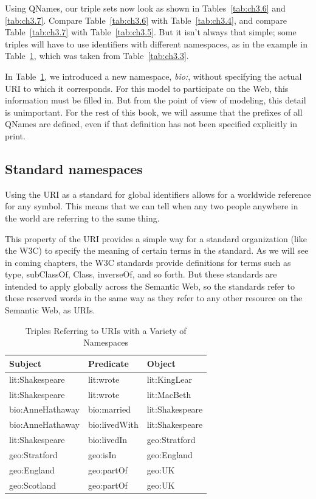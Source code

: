 Using QNames, our triple sets now look as shown in Tables~\ref{tab:ch3.6} and \ref{tab:ch3.7}.
Compare Table~\ref{tab:ch3.6} with Table~\ref{tab:ch3.4}, and compare Table~\ref{tab:ch3.7} with Table~\ref{tab:ch3.5}.
But it isn't always that simple; some triples will have to use
identifiers with different namespaces, as in the example in Table~\ref{tab:ch3.8},
which was taken from Table~\ref{tab:ch3.3}.

In Table~\ref{tab:ch3.8}, we introduced a new namespace, \emph{bio:}, without
specifying the actual URI to which it corresponds. For this model to
participate on the Web, this information must be filled in. But from the
point of view of modeling, this detail is unimportant. For the rest of
this book, we will assume that the prefixes of all QNames are defined,
even if that definition has not been specified explicitly in print.

\subsection{Standard namespaces}

Using the URI as a standard for global identifiers allows for a
worldwide reference for any symbol. This means that we can tell when any
two people anywhere in the world are referring to the same thing.

This property of the URI provides a simple way for a standard
organization (like the W3C) to specify the meaning of certain terms in
the standard. As we will see in coming chapters, the W3C standards
provide definitions for terms such as type, subClassOf, Class,
inverseOf, and so forth. But these standards are intended to apply
globally across the Semantic Web, so the standards refer to these reserved words in the same way as they refer to any other
resource on the Semantic Web, as URIs.

\begin{table}[h]
\centering
\begin{tabular}{||l l l ||} 
 \hline
 Subject&Predicate&Object \\ [0.5ex] 
 \hline\hline
lit:Shakespeare&lit:wrote&lit:KingLear\\
lit:Shakespeare&lit:wrote&lit:MacBeth\\
bio:AnneHathaway&bio:married&lit:Shakespeare\\
bio:AnneHathaway&bio:livedWith&lit:Shakespeare\\
lit:Shakespeare&bio:livedIn&geo:Stratford\\
geo:Stratford&geo:isIn&geo:England\\
geo:England&geo:partOf&geo:UK\\
geo:Scotland&geo:partOf&geo:UK\\
\hline
\end{tabular}
\caption{Triples Referring to URIs with a Variety of Namespaces}
\label{tab:ch3.8}
\end{table}



